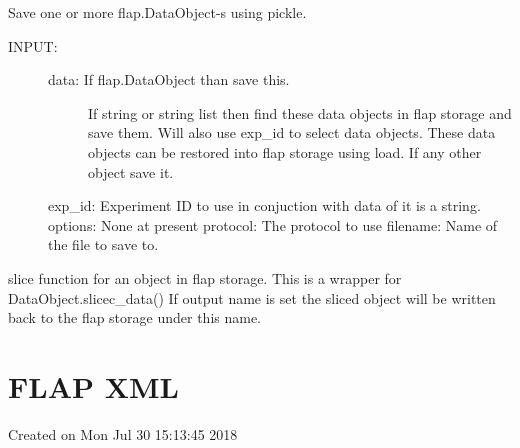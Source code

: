 \documentclass[letterpaper,10pt,english]{sphinxmanual}
\begin{document}

\begin{fulllineitems}
\label{\detokenize{data_object:flap.data_object.save}}
Save one or more flap.DataObject-s using pickle.
\begin{description}
\item[{INPUT:}] \leavevmode\begin{description}
\item[{data: If flap.DataObject than save this.}] \leavevmode
If string or string list then find these data objects in flap storage and save them.
Will also use exp\_id to select data objects. These data objects can be restored
into flap storage using load.
If any other object save it.

\end{description}

exp\_id: Experiment ID to use in conjuction with data of it is a string.
options: None at present
protocol: The protocol to use
filename: Name of the file to save to.

\end{description}

\end{fulllineitems}


\begin{fulllineitems}
\label{\detokenize{data_object:flap.data_object.slice_data}}
slice function for an object in flap storage. This is a wrapper for DataObject.slicec\_data()
If output name is set the sliced object will be written back to the flap storage under this name.

\end{fulllineitems}



\section{FLAP XML}
\label{\detokenize{flap_xml:module-flap.flap_xml}}\label{\detokenize{flap_xml:flap-xml}}\label{\detokenize{flap_xml::doc}}
Created on Mon Jul 30 15:13:45 2018
\end{document}
